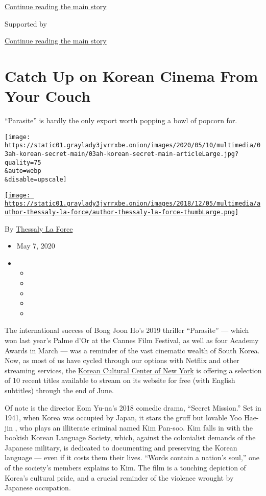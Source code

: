 \protect\hyperlink{after-top}{Continue reading the main story}

Supported by

\protect\hyperlink{after-sponsor}{Continue reading the main story}

\hypertarget{catch-up-on-korean-cinema-from-your-couch}{%
\section{Catch Up on Korean Cinema From Your
Couch}\label{catch-up-on-korean-cinema-from-your-couch}}

``Parasite'' is hardly the only export worth popping a bowl of popcorn
for.

\texttt{[image: https://static01.graylady3jvrrxbe.onion/images/2020/05/10/multimedia/03ah-korean-secret-main/03ah-korean-secret-main-articleLarge.jpg?quality=75\\\&auto=webp\\\&disable=upscale]}

\href{https://www.nytimes3xbfgragh.onion/by/thessaly-la-force}{\texttt{[image: https://static01.graylady3jvrrxbe.onion/images/2018/12/05/multimedia/author-thessaly-la-force/author-thessaly-la-force-thumbLarge.png]}}

By
\href{https://www.nytimes3xbfgragh.onion/by/thessaly-la-force}{Thessaly
La Force}

\begin{itemize}
\item
  May 7, 2020
\item
  \begin{itemize}
  \item
  \item
  \item
  \item
  \item
  \end{itemize}
\end{itemize}

The international success of Bong Joon Ho's 2019 thriller ``Parasite''
--- which won last year's Palme d'Or at the Cannes Film Festival, as
well as four Academy Awards in March --- was a reminder of the vast
cinematic wealth of South Korea. Now, as most of us have cycled through
our options with Netflix and other streaming services, the
\href{http://www.koreanculture.org/}{Korean Cultural Center of New York}
is offering a selection of 10 recent titles available to stream on its
website for free (with English subtitles) through the end of June.

Of note is the director Eom Yu-na's 2018 comedic drama, ``Secret
Mission.'' Set in 1941, when Korea was occupied by Japan, it stars the
gruff but lovable Yoo Hae-jin , who plays an illiterate criminal named
Kim Pan-soo. Kim falls in with the bookish Korean Language Society,
which, against the colonialist demands of the Japanese military, is
dedicated to documenting and preserving the Korean language --- even if
it costs them their lives. ``Words contain a nation's soul,'' one of the
society's members explains to Kim. The film is a touching depiction of
Korea's cultural pride, and a crucial reminder of the violence wrought
by Japanese occupation.

